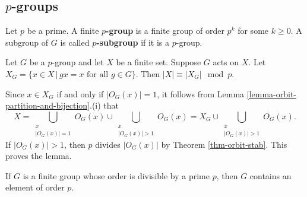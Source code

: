 \subsection{$p$-groups}
\begin{definition}
	Let $p$ be a prime. A finite \textbf{$p$-group} is a finite group of order $p^k$ for some $k\geq 0$. A subgroup of $G$ is called \textbf{$p$-subgroup} if it is a $p$-group.
\end{definition}
\begin{lemma} \label{lemma-fixed-point-lemma}
	Let $G$ be a $p$-group and let $X$ be a finite set. Suppose $G$ acts on $X$. Let $X_G = \{x\in X\,|\, gx =x \text{ for all }g\in G\}$. Then $|X| \equiv |X_G| \mod p$.
\end{lemma}
\begin{sketch}
	Since $x\in X_G$ if and only if $|O_G(x)| = 1$, it follows from Lemma \ref{lemma-orbit-partition-and-bijection}.(i) that  $$X = \bigcup_{\substack{x \\ |O_G(x)|=1}} O_G(x) \cup \bigcup_{\substack{x \\ |O_G(x)|>1}} O_G(x) = X_G \cup \bigcup_{\substack{x \\ |O_G(x)|>1}} O_G(x).$$ If $|O_G(x)|>1$, then $p$ divides $|O_G(x)|$ by Theorem \ref{thm-orbit-stab}. This proves the lemma.
\end{sketch}
\begin{theorem} \label{thm-Cauchy}
	If $G$ is a finite group whose order is divisible by a prime $p$, then $G$ contains an element of order $p$.
\end{theorem}
